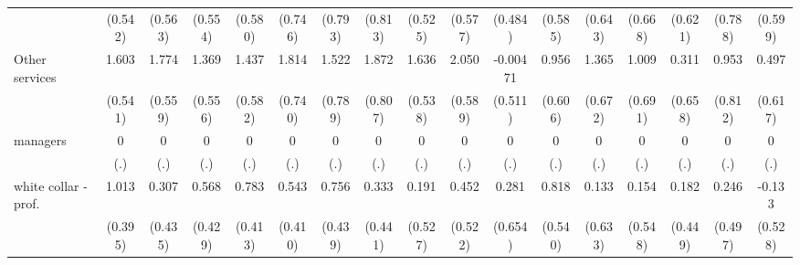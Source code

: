{\begin{tabular}{l*{16}{c}}
                    &     (0.542)         &     (0.563)         &     (0.554)         &     (0.580)         &     (0.746)         &     (0.793)         &     (0.813)         &     (0.525)         &     (0.577)         &     (0.484)         &     (0.585)         &     (0.643)         &     (0.668)         &     (0.621)         &     (0.788)         &     (0.599)         \\
[1em]
Other services      &       1.603\sym{**} &       1.774\sym{**} &       1.369\sym{*}  &       1.437\sym{*}  &       1.814\sym{*}  &       1.522         &       1.872\sym{*}  &       1.636\sym{**} &       2.050\sym{***}&    -0.00471         &       0.956         &       1.365\sym{*}  &       1.009         &       0.311         &       0.953         &       0.497         \\
                    &     (0.541)         &     (0.559)         &     (0.556)         &     (0.582)         &     (0.740)         &     (0.789)         &     (0.807)         &     (0.538)         &     (0.589)         &     (0.511)         &     (0.606)         &     (0.672)         &     (0.691)         &     (0.658)         &     (0.812)         &     (0.617)         \\
[1em]
managers            &           0         &           0         &           0         &           0         &           0         &           0         &           0         &           0         &           0         &           0         &           0         &           0         &           0         &           0         &           0         &           0         \\
                    &         (.)         &         (.)         &         (.)         &         (.)         &         (.)         &         (.)         &         (.)         &         (.)         &         (.)         &         (.)         &         (.)         &         (.)         &         (.)         &         (.)         &         (.)         &         (.)         \\
[1em]
white collar - prof.&       1.013\sym{*}  &       0.307         &       0.568         &       0.783         &       0.543         &       0.756         &       0.333         &       0.191         &       0.452         &       0.281         &       0.818         &       0.133         &       0.154         &       0.182         &       0.246         &      -0.133         \\
                    &     (0.395)         &     (0.435)         &     (0.429)         &     (0.413)         &     (0.410)         &     (0.439)         &     (0.441)         &     (0.527)         &     (0.522)         &     (0.654)         &     (0.540)         &     (0.633)         &     (0.548)         &     (0.449)         &     (0.497)         &     (0.528)         \\

\end{tabular}}
